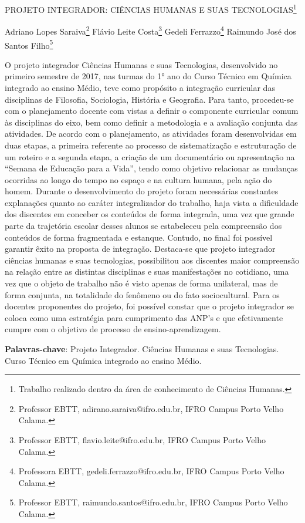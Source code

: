 \documentclass[article,12pt,onesidea,4paper,english,brazil]{abntex2}
\begin{document}
	
	
	\frenchspacing 
	
	\begin{center}
		\LARGE PROJETO INTEGRADOR: CIÊNCIAS HUMANAS E SUAS TECNOLOGIAS\footnote{Trabalho realizado dentro da área de conhecimento de Ciências Humanas.}
		
		\normalsize
	Adriano Lopes Saraiva\footnote{Professor EBTT, adirano.saraiva@ifro.edu.br, IFRO Campus Porto Velho Calama.} 
	Flávio Leite Costa\footnote{Professor EBTT, flavio.leite@ifro.edu.br, IFRO Campus Porto Velho Calama.} 
	Gedeli Ferrazzo\footnote{Professora EBTT, gedeli.ferrazzo@ifro.edu.br, IFRO Campus Porto Velho Calama.} 
	Raimundo José dos Santos Filho\footnote{Professor EBTT, raimundo.santos@ifro.edu.br, IFRO Campus Porto Velho Calama.} 
	\end{center}
	
	\noindent O projeto integrador Ciências Humanas e suas Tecnologias, desenvolvido no
	primeiro semestre de 2017, nas turmas do 1° ano do Curso Técnico em Química
	integrado ao ensino Médio, teve como propósito a integração curricular das
	disciplinas de Filosofia, Sociologia, História e Geografia. Para tanto, procedeu-se
	com o planejamento docente com vistas a definir o componente curricular comum às
	disciplinas do eixo, bem como definir a metodologia e a avaliação conjunta das
	atividades. De acordo com o planejamento, as atividades foram desenvolvidas em
	duas etapas, a primeira referente ao processo de sistematização e estruturação de
	um roteiro e a segunda etapa, a criação de um documentário ou apresentação na
	“Semana de Educação para a Vida”, tendo como objetivo relacionar as mudanças
	ocorridas ao longo do tempo no espaço e na cultura humana, pela ação do homem.
	Durante o desenvolvimento do projeto foram necessárias constantes explanações
	quanto ao caráter integralizador do trabalho, haja vista a dificuldade dos discentes
	em conceber os conteúdos de forma integrada, uma vez que grande parte da
	trajetória escolar desses alunos se estabeleceu pela compreensão dos conteúdos de
	forma fragmentada e estanque. Contudo, no final foi possível garantir êxito na
	proposta de integração. Destaca-se que projeto integrador ciências humanas e suas
	tecnologias, possibilitou aos discentes maior compreensão na relação entre as
	distintas disciplinas e suas manifestações no cotidiano, uma vez que o objeto de
	trabalho não é visto apenas de forma unilateral, mas de forma conjunta, na
	totalidade do fenômeno ou do fato sociocultural. Para os docentes proponentes do
	projeto, foi possível constar que o projeto integrador se coloca como uma estratégia
	para cumprimento das ANP’s e que efetivamente cumpre com o objetivo de
	processo de ensino-aprendizagem.
	
	\vspace{\onelineskip}
	
	\noindent
	\textbf{Palavras-chave}: Projeto Integrador. Ciências Humanas e suas Tecnologias. Curso Técnico em Química integrado ao ensino Médio.
	
\end{document}
